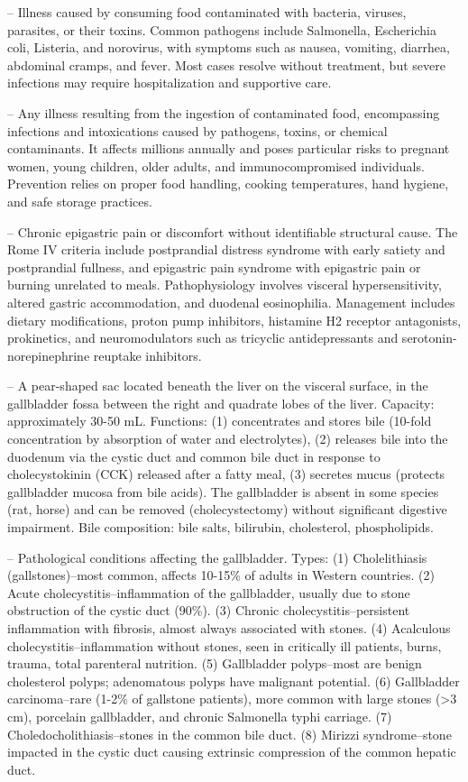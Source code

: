 -- Illness caused by consuming food contaminated with bacteria, viruses, parasites, or their toxins. Common pathogens include Salmonella, Escherichia coli, Listeria, and norovirus, with symptoms such as nausea, vomiting, diarrhea, abdominal cramps, and fever. Most cases resolve without treatment, but severe infections may require hospitalization and supportive care.

-- Any illness resulting from the ingestion of contaminated food, encompassing infections and intoxications caused by pathogens, toxins, or chemical contaminants. It affects millions annually and poses particular risks to pregnant women, young children, older adults, and immunocompromised individuals. Prevention relies on proper food handling, cooking temperatures, hand hygiene, and safe storage practices.

-- Chronic epigastric pain or discomfort without identifiable structural cause. The Rome IV criteria include postprandial distress syndrome with early satiety and postprandial fullness, and epigastric pain syndrome with epigastric pain or burning unrelated to meals. Pathophysiology involves visceral hypersensitivity, altered gastric accommodation, and duodenal eosinophilia. Management includes dietary modifications, proton pump inhibitors, histamine H2 receptor antagonists, prokinetics, and neuromodulators such as tricyclic antidepressants and serotonin-norepinephrine reuptake inhibitors.

-- A pear-shaped sac located beneath the liver on the visceral surface, in the gallbladder fossa between the right and quadrate lobes of the liver. Capacity: approximately 30-50 mL. Functions: (1) concentrates and stores bile (10-fold concentration by absorption of water and electrolytes), (2) releases bile into the duodenum via the cystic duct and common bile duct in response to cholecystokinin (CCK) released after a fatty meal, (3) secretes mucus (protects gallbladder mucosa from bile acids). The gallbladder is absent in some species (rat, horse) and can be removed (cholecystectomy) without significant digestive impairment. Bile composition: bile salts, bilirubin, cholesterol, phospholipids.

-- Pathological conditions affecting the gallbladder. Types: (1) Cholelithiasis (gallstones)--most common, affects 10-15\% of adults in Western countries. (2) Acute cholecystitis--inflammation of the gallbladder, usually due to stone obstruction of the cystic duct (90\%). (3) Chronic cholecystitis--persistent inflammation with fibrosis, almost always associated with stones. (4) Acalculous cholecystitis--inflammation without stones, seen in critically ill patients, burns, trauma, total parenteral nutrition. (5) Gallbladder polyps--most are benign cholesterol polyps; adenomatous polyps have malignant potential. (6) Gallbladder carcinoma--rare (1-2\% of gallstone patients), more common with large stones (>3 cm), porcelain gallbladder, and chronic Salmonella typhi carriage. (7) Choledocholithiasis--stones in the common bile duct. (8) Mirizzi syndrome--stone impacted in the cystic duct causing extrinsic compression of the common hepatic duct.

